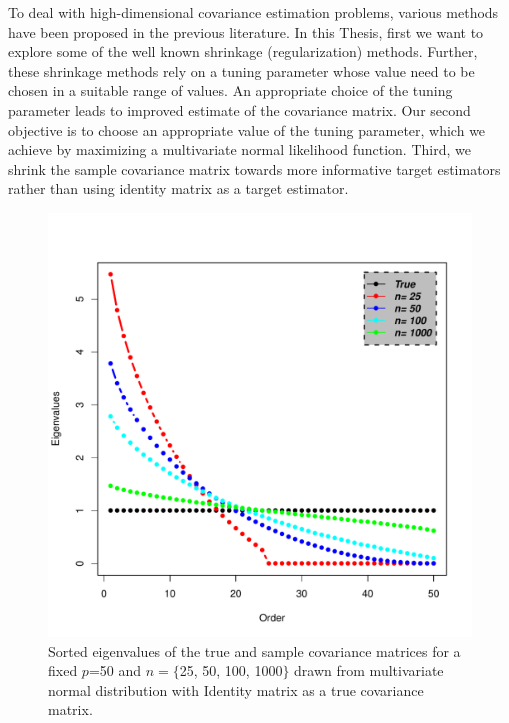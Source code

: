  To deal with high-dimensional covariance estimation problems, various methods have been proposed in the previous literature. In this Thesis, first we want to explore some of the well known shrinkage (regularization) methods. Further, these shrinkage methods rely on a tuning parameter whose value need to be chosen in a suitable range of values. An appropriate choice of the tuning parameter leads to improved estimate of the covariance matrix. Our second objective is to choose an appropriate value of the tuning parameter, which we achieve by maximizing a multivariate normal likelihood function. Third, we shrink the sample covariance matrix towards more informative target estimators rather than using identity matrix as a target estimator.   


\begin{figure}[h]
    	\begin{center}
    		\includegraphics[scale=0.55]{screeplot.pdf}
    		\caption{Sorted eigenvalues of the true and sample covariance matrices for a fixed $p$=50 and $n = \lbrace$25, 50, 100, 1000$\rbrace$ drawn from multivariate normal distribution with Identity matrix as a true covariance matrix.} 
    		\label{Fig1.1}
    	\end{center}
    \end{figure}

